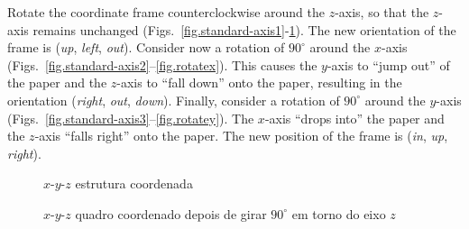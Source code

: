 Rotate the coordinate frame counterclockwise around the $z$-axis, so that the $z$-axis remains unchanged (Figs.~\ref{fig.standard-axis1}-\ref{fig.rotatez}). The new orientation of the frame is (\textit{up}, \textit{left}, \textit{out}). Consider now a rotation of $90^\circ$ around the $x$-axis (Figs.~\ref{fig.standard-axis2}--\ref{fig.rotatex}). This causes the $y$-axis to ``jump out'' of the paper and the $z$-axis to ``fall down'' onto the paper, resulting in the orientation (\textit{right}, \textit{out}, \textit{down}). Finally, consider a rotation of $90^\circ$ around the $y$-axis (Figs.~\ref{fig.standard-axis3}--\ref{fig.rotatey}). The $x$-axis ``drops into'' the paper and the $z$-axis ``falls right'' onto the paper. The new position of the frame is (\textit{in}, \textit{up}, \textit{right}).

\begin{figure}
\begin{minipage}{.48\textwidth}
\caption{$x$-$y$-$z$ estrutura coordenada}\label{fig.standard-axis1}
\end{minipage}
\hspace{\fill}
\begin{minipage}{.48\textwidth}
\caption{$x$-$y$-$z$ quadro coordenado depois de girar $90^\circ$ em torno do eixo $z$}\label{fig.rotatez}
\end{minipage}
\end{figure}


